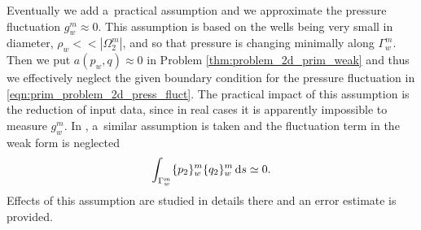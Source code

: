 Eventually we add a~practical assumption and we approximate the pressure fluctuation $g^m_w\approx 0$.
This assumption is based on the wells being very small in diameter, $\rho_w << |\Omega^m_2|$,
and so that pressure is changing minimally along $\Gamma^m_w$.
Then we put $a(p_w,q)\approx 0$ in Problem \eqref{thm:problem_2d_prim_weak}
and thus we effectively neglect the given boundary condition for the pressure fluctuation in \eqref{eqn:prim_problem_2d_press_fluct}.
The practical impact of this assumption is the reduction of input data, since in real cases
it is apparently impossible to measure $g^m_w$.
%
In \cite{koppl_vidotto_2018}, a~similar assumption is taken and the fluctuation term in the weak form is neglected
\begin{equation} \label{eqn:well_edge_fluctuation_neglect}
    \int_{\Gamma^m_w} \{p_2\}^m_w\{q_2\}^m_w \,{\rm d} s \simeq 0.
\end{equation}
Effects of this assumption are studied in details there and an error estimate is provided.


